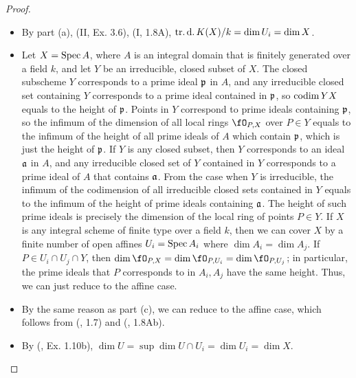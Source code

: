 \documentclass[a4paper]{article}
\begin{document}
\begin{enumerate} [label=\textbf{\arabic*.}, leftmargin=0em]
\begin{proof}
\begin{itemize} [leftmargin=0cm]
                  \item[(b)] By part (a), (II, Ex. 3.6), (I, 1.8A), $\operatorname{tr.d.}{K(X)} / k = \dim{U_i} = \dim{X}$.

                  \item[(c)] Let $X = \operatorname{Spec}{A}$, where $A$ is an integral domain that is finitely generated over a field $k$, and let $Y$ be an irreducible, closed subset of $X$.
                        The closed subscheme $Y$ corresponds to a prime ideal $\mathfrak{p}$ in $A$, and any irreducible closed set containing $Y$ corresponds to a prime ideal contained in $\mathfrak{p}$, so $\operatorname{codim}{Y}{X}$ equals to the height of $\mathfrak{p}$. Points in $Y$ correspond to prime ideals containing $\mathfrak{p}$, so the infimum of the dimension of all local rings $\fO_{P, X}$ over $P \in Y$ equals to the infimum of the height of all prime ideals of $A$ which contain $\mathfrak{p}$, which is just the height of $\mathfrak{p}$. If $Y$ is any closed subset, then $Y$ corresponds to an ideal $\mathfrak{a}$ in $A$, and any irreducible closed set of $Y$ contained in $Y$ corresponds to a prime ideal of $A$ that contains $\mathfrak{a}$. From the case when $Y$ is irreducible, the infimum of the codimension of all irreducible closed sets contained in $Y$ equals to the infimum of the height of prime ideals containing $\mathfrak{a}$. The height of such prime ideals is precisely the dimension of the local ring of points $P \in Y$. If $X$ is any integral scheme of finite type over a field $k$, then we can cover $X$ by a finite number of open affines $U_i = \operatorname{Spec}{A_i}$ where $\dim{A_i} = \dim{A_j}$. If $P \in U_i \cap U_j \cap Y$, then $\dim{\fO_{P, X}} = \dim{\fO_{P, U_i}} = \dim{\fO_{P, U_j}}$; in particular, the prime ideals that $P$ corresponds to in $A_i, A_j$ have the same height. Thus, we can just reduce to the affine case.

                  \item[(d)] By the same reason as part (c), we can reduce to the affine case, which follows from (, 1.7) and (, 1.8Ab).

                  \item[(e)] By (, Ex. 1.10b), $\dim{U} = \sup{\dim{U \cap U_i}} = \dim{U_i} = \dim{X}$.


\end{itemize}
\end{proof}
\end{enumerate}
\end{document}

